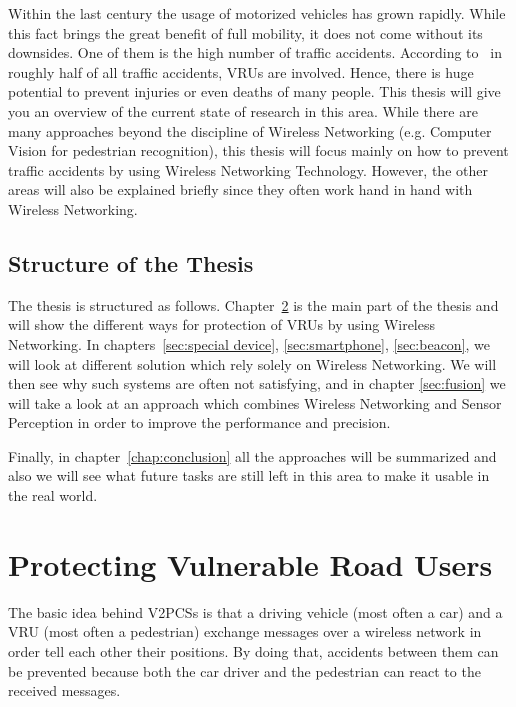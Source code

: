 \documentclass[]{ccs-thesis}
\begin{document}
Within the last century the usage of motorized vehicles has grown rapidly. While this fact brings the great benefit of full mobility, it does not come without its downsides. One of them is the high number of traffic accidents. According to~\cite{v2pcomm} in roughly half of all traffic accidents, \acp{VRU} are involved. Hence, there is huge potential to prevent injuries or even deaths of many people. This thesis will give you an overview of the current state of research in this area. While there are many approaches beyond the discipline of Wireless Networking (e.g. Computer Vision for pedestrian recognition), this thesis will focus mainly on how to prevent traffic accidents by using Wireless Networking Technology. However, the other areas will also be explained briefly since they often work hand in hand with Wireless Networking.

\section{Structure of the Thesis}
\label{sec:structure}

The thesis is structured as follows. Chapter~\ref{chap:v2p} is the main part of the thesis and will show the different ways for protection of \acp{VRU} by using Wireless Networking. In chapters~\ref{sec:special device}, \ref{sec:smartphone}, \ref{sec:beacon}, we will look at different solution which rely solely on Wireless Networking. We will then see why such systems are often not satisfying, and in chapter \ref{sec:fusion} we will take a look at an approach which combines Wireless Networking and Sensor Perception in order to improve the performance and precision.

Finally, in chapter~\ref{chap:conclusion} all the approaches will be summarized and also we will see what future tasks are still left in this area to make it usable in the real world.


\chapter{Protecting Vulnerable Road Users}
\label{chap:v2p}

The basic idea behind \acp{V2PCS} is that a driving vehicle (most often a car) and a \ac{VRU} (most often a pedestrian) exchange messages over a wireless network in order tell each other their positions. By doing that, accidents between them can be prevented because both the car driver and the pedestrian can react to the received messages.
\end{document}
